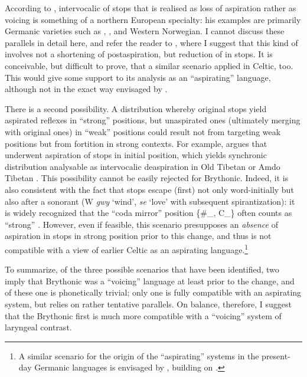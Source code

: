 \documentclass[output=paper,colorlinks,citecolor=brown]{langscibook}
\begin{document}
According to \textcite[49]{kümmel2007konsonantenwandel}, intervocalic  of  stops that is realised as loss of aspiration rather as voicing is something of a northern European specialty: his examples are primarily Germanic varieties such as , , and Western Norwegian. I cannot discuss these parallels in detail here, and refer the reader to \textcite{iosad2020phonological}, where I suggest that this kind of  involves not a shortening of postaspiration, but reduction of  in  stops. It is conceivable, but difficult to prove, that a similar scenario applied in Celtic, too. This would give some support to its analysis as an \enquote{aspirating} language, although not in the exact way envisaged by \textcite{eska2020interarticulatory}.

There is a second possibility. A distribution whereby original  stops yield aspirated reflexes in \enquote{strong} positions, but unaspirated ones (ultimately merging with original  ones) in \enquote{weak} positions could result not from  targeting weak positions but from fortition in strong contexts. For example, \textcite{hill2007aspirated} argues that  underwent aspiration of stops in initial position, which yields synchronic distribution analysable as intervocalic deaspiration in Old Tibetan \parencite{hill2010old} or Amdo Tibetan \parencite{green2012amdo}. This possibility cannot be easily rejected for Brythonic. Indeed, it is also consistent with the fact that stops escape (first)  not only word-initially but also after a sonorant (W \textit {gwy} `wind', \textit{se} `love' with subsequent spirantization): it is widely recognized that the \enquote{coda mirror} position \{\#\_, C\_\} often counts as \enquote{strong} \parencite{segeral08:_posit}. However, even if feasible, this scenario presupposes an \emph{absence} of aspiration in  stops in strong position prior to this change, and thus is not compatible with a view of earlier Celtic as an aspirating language.\footnote{A similar scenario for the origin of the \enquote{aspirating} systems in the present\hyp day Germanic languages is envisaged by \textcite{goblirsch2005lautverschiebungen}, building on \textcite{steblin}.}

To summarize, of the three possible scenarios that have been identified, two imply that Brythonic was a \enquote{voicing} language at least prior to the change, and of these one is phonetically trivial; only one is fully compatible with an aspirating system, but relies on rather tentative parallels. On balance, therefore, I suggest that the Brythonic first  is much more compatible with a \enquote{voicing} system of laryngeal contrast.
\end{document}
